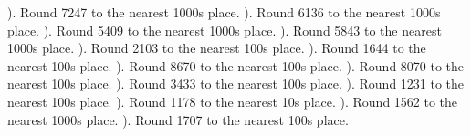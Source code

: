 \documentclass{article}%
\begin{document}
\newline%
\newline%
). Round 7247 to the nearest 1000s place.%
\newline%
\newline%
). Round 6136 to the nearest 1000s place.%
\newline%
\newline%
). Round 5409 to the nearest 1000s place.%
\newline%
\newline%
). Round 5843 to the nearest 1000s place.%
\newline%
\newline%
). Round 2103 to the nearest 100s place.%
\newline%
\newline%
). Round 1644 to the nearest 100s place.%
\newline%
\newline%
). Round 8670 to the nearest 100s place.%
\newline%
\newline%
). Round 8070 to the nearest 100s place.%
\newline%
\newline%
). Round 3433 to the nearest 100s place.%
\newline%
\newline%
). Round 1231 to the nearest 100s place.%
\newline%
\newline%
). Round 1178 to the nearest 10s place.%
\newline%
\newline%
). Round 1562 to the nearest 1000s place.%
\newline%
\newline%
). Round 1707 to the nearest 100s place.%
\newline%
\newline%
\end{document}
